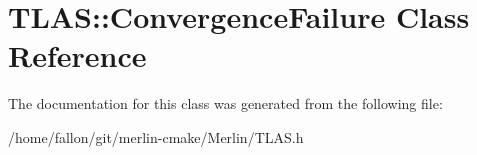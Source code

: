 \hypertarget{classTLAS_1_1ConvergenceFailure}{}\section{T\+L\+AS\+:\+:Convergence\+Failure Class Reference}
\label{classTLAS_1_1ConvergenceFailure}


The documentation for this class was generated from the following file\+:\begin{DoxyCompactItemize}
\item 
/home/fallon/git/merlin-\/cmake/\+Merlin/T\+L\+A\+S.\+h\end{DoxyCompactItemize}
